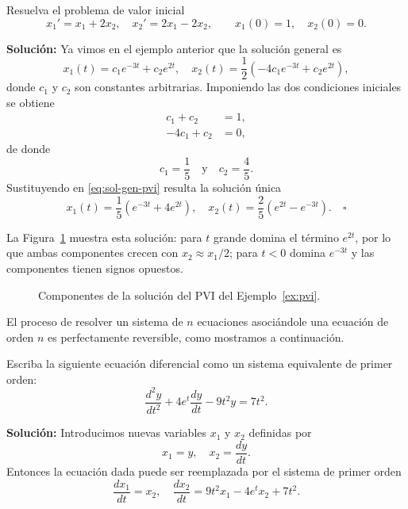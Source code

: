 \begin{example}\label{ex:pvi}
Resuelva el problema de valor inicial
\[
x_1' = x_1 + 2x_2, \quad x_2' = 2x_1 - 2x_2, \qquad
x_1(0) = 1, \quad x_2(0) = 0.
\]

\textbf{Soluci\'on:} Ya vimos en el ejemplo anterior que la soluci\'on general es
\begin{equation}\label{eq:sol-gen-pvi}
x_1(t) = c_1e^{-3t} + c_2e^{2t}, \quad x_2(t) = \frac{1}{2}(-4c_1e^{-3t} + c_2e^{2t}),
\end{equation}
donde $c_1$ y $c_2$ son constantes arbitrarias. Imponiendo las dos condiciones iniciales se obtiene
\begin{align*}
    c_1 + c_2 &= 1, \\
    -4c_1 + c_2 &= 0,
\end{align*}
de donde
\[
c_1 = \frac{1}{5} \quad \text{y} \quad c_2 = \frac{4}{5}.
\]
Sustituyendo en \eqref{eq:sol-gen-pvi} resulta la soluci\'on \'unica
\[
x_1(t) = \frac{1}{5}(e^{-3t} + 4e^{2t}), \quad x_2(t) = \frac{2}{5}(e^{2t} - e^{-3t}). \quad \square
\]
\end{example}

La Figura~\ref{fig:pvi-curvas} muestra esta soluci\'on: para $t$ grande domina el t\'ermino $e^{2t}$, por lo que ambas componentes crecen con $x_2\approx x_1/2$; para $t<0$ domina $e^{-3t}$ y las componentes tienen signos opuestos.

\begin{figure}[H]
\centering
{}
\caption{Componentes de la soluci\'on del PVI del Ejemplo~\ref{ex:pvi}.}
\label{fig:pvi-curvas}
\end{figure}

El proceso de resolver un sistema de $n$ ecuaciones asoci\'andole una ecuaci\'on de orden $n$ es perfectamente reversible, como mostramos a continuaci\'on.

\begin{example}
Escriba la siguiente ecuaci\'on diferencial como un sistema equivalente de primer orden:
\[
\frac{d^2y}{dt^2} + 4e^t \frac{dy}{dt} - 9t^2y = 7t^2.
\]

\textbf{Soluci\'on:} Introducimos nuevas variables $x_1$ y $x_2$ definidas por
\[
x_1 = y, \quad x_2 = \frac{dy}{dt}.
\]
Entonces la ecuaci\'on dada puede ser reemplazada por el sistema de primer orden
\[
\frac{dx_1}{dt} = x_2, \quad \frac{dx_2}{dt} = 9t^2x_1 - 4e^t x_2 + 7t^2.
\]
\end{example}

